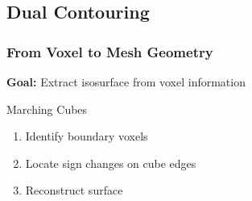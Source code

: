 
\subsection{Dual Contouring}

\begin{frame}
	\frametitle{From Voxel to Mesh Geometry}
	\vspace{-0.8cm}
	\begin{center}
	\textbf{Goal:} Extract isosurface from voxel information	
	\end{center}
\vspace{-0.5cm}	
\begin{minipage}[t]{0.4\linewidth}
		\begin{block}{Marching Cubes}
	\begin{enumerate}
		\item<2-> Identify boundary voxels
		\item<3-> Locate sign changes on cube edges
		\item<4-> Reconstruct surface
	\end{enumerate}
	

\end{block}
\end{minipage}
\end{frame}
